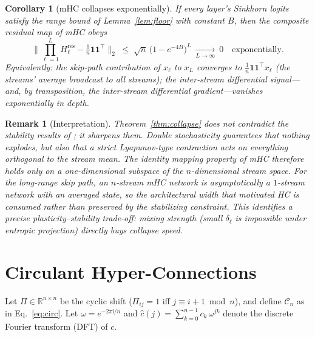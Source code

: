 \documentclass[11pt]{article}
\newtheorem{corollary}{Corollary}
\newtheorem{remark}{Remark}
\newcommand{\R}{\mathbb{R}}
\newcommand{\ones}{\mathbf{1}}
\newcommand{\Hres}{H^{\mathrm{res}}}
\newcommand{\J}{\tfrac{1}{n}\ones\ones^{\!\top}}
\begin{document}
\begin{corollary}[mHC collapses exponentially]
\label{cor:sinkhorn}
If every layer's Sinkhorn logits satisfy the range bound of Lemma~\ref{lem:floor} with constant $B$, then the composite residual map of mHC obeys
\begin{equation}
\Big\|\prod_{\ell=1}^{L}\Hres_\ell-\J\Big\|_2\;\le\;\sqrt{n}\,\big(1-e^{-4B}\big)^{L}\ \xrightarrow[L\to\infty]{}\ 0 \quad\text{exponentially.}
\end{equation}
Equivalently: the skip-path contribution of $x_\ell$ to $x_L$ converges to $\J x_\ell$ (the streams' average broadcast to all streams); the inter-stream differential signal---and, by transposition, the inter-stream differential gradient---vanishes exponentially in depth.
\end{corollary}

\begin{remark}[Interpretation]
Theorem~\ref{thm:collapse} does not contradict the stability results of \citet{xie2025mhc}; it \emph{sharpens} them. Double stochasticity guarantees that nothing explodes, but also that a strict Lyapunov-type contraction acts on everything orthogonal to the stream mean. The identity mapping property of mHC therefore holds \emph{only on a one-dimensional subspace} of the $n$-dimensional stream space. For the long-range skip path, an $n$-stream mHC network is asymptotically a $1$-stream network with an averaged state, so the architectural width that motivated HC is consumed rather than preserved by the stabilizing constraint. This identifies a precise plasticity--stability trade-off: mixing strength (small $\delta_\ell$ is impossible under entropic projection) directly buys collapse speed.
\end{remark}

\section{Circulant Hyper-Connections}
\label{sec:cmhc}

Let $\Pi\in\R^{n\times n}$ be the cyclic shift ($\Pi_{ij}=1$ iff $j\equiv i+1 \bmod n$), and define $\mathcal{C}_n$ as in Eq.~\eqref{eq:circ}. Let $\omega=e^{-2\pi\mathrm{i}/n}$ and $\hat c(j)=\sum_{k=0}^{n-1}c_k\,\omega^{jk}$ denote the discrete Fourier transform (DFT) of $c$.
\end{document}
